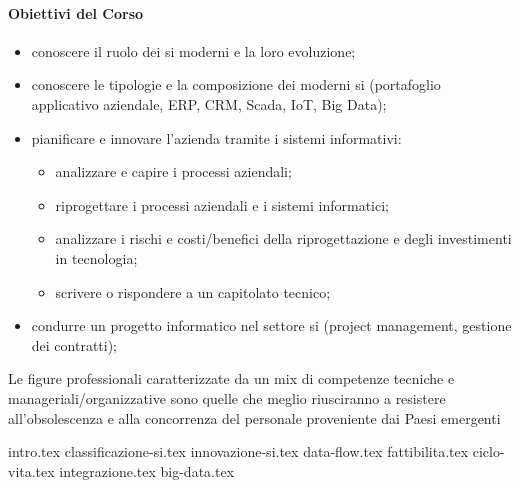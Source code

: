 \documentclass[12pt, a4paper]{scrreprt}
\begin{document}
\paragraph{Obiettivi del Corso}\label{par:obiettivi_del_corso} %
\begin{itemize}
    \item conoscere il ruolo dei \ac{si} moderni e la loro evoluzione;
    \item conoscere le tipologie e la composizione dei moderni \ac{si} (portafoglio applicativo aziendale, ERP, CRM, Scada, IoT, Big Data);
    \item pianificare e innovare l'azienda tramite i sistemi informativi:
        \begin{itemize}
            \item analizzare e capire i processi aziendali;
            \item riprogettare i processi aziendali e i sistemi informatici;
            \item analizzare i rischi e costi/benefici della riprogettazione e degli investimenti in tecnologia;
            \item scrivere o rispondere a un capitolato tecnico;
        \end{itemize}
    \item condurre un progetto informatico nel settore \ac{si} (project management, gestione dei contratti);
\end{itemize}
\begin{note}
    Le figure professionali caratterizzate da un mix di competenze tecniche e manageriali/organizzative sono quelle che meglio riusciranno a resistere all'obsolescenza e alla concorrenza del personale proveniente dai Paesi emergenti
\end{note}

%
{intro.tex}
%
{classificazione-si.tex}
%
{innovazione-si.tex}
%
{data-flow.tex}
%
{fattibilita.tex}
%
{ciclo-vita.tex}
%
{integrazione.tex}
%
{big-data.tex}
%
\end{document}
